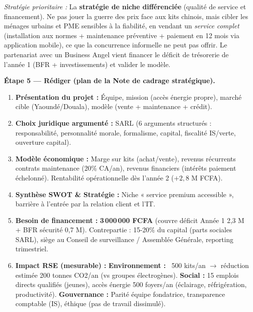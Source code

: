 \documentclass[11pt]{article}
\newcounter{popsec}
\newcounter{popsub}
\newcommand{\courssub}[1]{%
  \stepcounter{popsub}%
  \par\vspace{9pt}\noindent{\popxbold\fontsize{11.5}{13}\selectfont\color{popink}{\color{poporange}\thepopsec.\thepopsub}\hspace{6pt}#1}\par\nopagebreak\vspace{4pt}
}
\begin{document}
\begin{exoresolu}
\emph{Stratégie prioritaire :} La \textbf{stratégie de niche différenciée} (qualité de service et financement). Ne pas jouer la guerre des prix face aux kits chinois, mais cibler les ménages urbains et PME sensibles à la fiabilité, en vendant un \emph{service complet} (installation aux normes + maintenance préventive + paiement en 12 mois via application mobile), ce que la concurrence informelle ne peut pas offrir. Le partenariat avec un Business Angel vient financer le déficit de trésorerie de l'année 1 (BFR + investissements) et valider le modèle.

\textbf{Étape 5 — Rédiger (plan de la Note de cadrage stratégique).}
\begin{enumerate}
\item \textbf{Présentation du projet :} Équipe, mission (accès énergie propre), marché cible (Yaoundé/Douala), modèle (vente + maintenance + crédit).
\item \textbf{Choix juridique argumenté :} SARL (6 arguments structurés : responsabilité, personnalité morale, formalisme, capital, fiscalité IS/verte, ouverture capital).
\item \textbf{Modèle économique :} Marge sur kits (achat/vente), revenus récurrents contrats maintenance (20\% CA/an), revenus financiers (intérêts paiement échelonné). Rentabilité opérationnelle dès l'année 2 ($+2,8$ M FCFA).
\item \textbf{Synthèse SWOT \& Stratégie :} Niche « service premium accessible », barrière à l'entrée par la relation client et l'IT.
\item \textbf{Besoin de financement :} \textbf{3\,000\,000 FCFA} (couvre déficit Année 1 2,3 M + BFR sécurité 0,7 M). Contrepartie : 15-20\% du capital (parts sociales SARL), siège au Conseil de surveillance / Assemblée Générale, reporting trimestriel.
\item \textbf{Impact RSE (mesurable) :} \textbf{Environnement :} ~500 kits/an $\rightarrow$ réduction estimée 200 tonnes CO2/an (vs groupes électrogènes). \textbf{Social :} 15 emplois directs qualifiés (jeunes), accès énergie 500 foyers/an (éclairage, réfrigération, productivité). \textbf{Gouvernance :} Parité équipe fondatrice, transparence comptable (IS), éthique (pas de travail dissimulé).
\end{enumerate}
\end{exoresolu}

\courssub{Bilan de l'activité}
\end{document}
